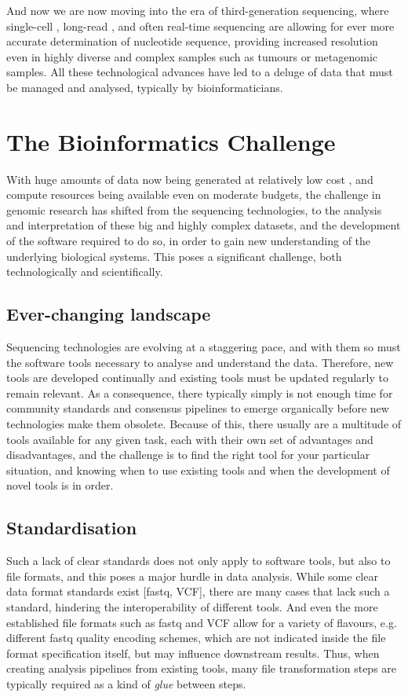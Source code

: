 And now we are now moving into the era of third-generation sequencing, where single-cell \cite{gawad2016single}, long-read \cite{koren2015one}, and often real-time sequencing \cite{flusberg2010direct} are allowing for ever more accurate determination of nucleotide sequence, providing increased resolution even in highly diverse and complex samples such as tumours or metagenomic samples. All these technological advances have led to a deluge of data that must be managed and analysed, typically by bioinformaticians.


\section{The Bioinformatics Challenge}

With huge amounts of data now being generated at relatively low cost \cite{chen2014big}, and compute resources being available even on moderate budgets, the challenge in genomic research has shifted from the sequencing technologies, to the analysis and interpretation of these big and highly complex datasets, and the development of the software required to do so, in order to gain new understanding of the underlying biological systems. This poses a significant challenge, both technologically and scientifically.

\subsection{Ever-changing landscape}
Sequencing technologies are evolving at a staggering pace, and with them so must the software tools necessary to analyse and understand the data. Therefore, new tools are developed continually and existing tools must be updated regularly to remain relevant. As a consequence, there typically simply is not enough time for community standards and consensus pipelines to emerge organically before new technologies make them obsolete. Because of this, there usually are a multitude of tools available for any given task, each with their own set of advantages and disadvantages, and the challenge is to find the right tool for your particular situation, and knowing when to use existing tools and when the development of novel tools is in order.

\subsection{Standardisation}
Such a lack of clear standards does not only apply to software tools, but also to file formats, and this poses a major hurdle in data analysis. While some clear data format standards exist [fastq, VCF], there are many cases that lack such a standard, hindering the interoperability of different tools. And even the more established file formats such as fastq and VCF allow for a variety of flavours, e.g. different fastq quality encoding schemes, which are not indicated inside the file format specification itself, but may influence downstream results. Thus, when creating analysis pipelines from existing tools, many file transformation steps are typically required as a kind of \textit{glue} between steps.

